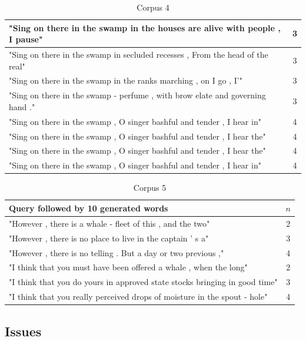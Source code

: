 \documentclass[a4paper,12pt]{article}
\begin{document}
\begin{table}
\begin{tabular}{| l |c|}
"Sing on there in the swamp in the houses are alive with people , I pause" & 3 \\ \hline
"Sing on there in the swamp in secluded recesses , From the head of the real" & 3 \\ \hline
"Sing on there in the swamp in the ranks marching , on I go , I'" & 3 \\ \hline
"Sing on there in the swamp - perfume , with brow elate and governing hand ." & 3 \\ \hline

"Sing on there in the swamp , O singer bashful and tender , I hear in" & 4 \\ \hline
"Sing on there in the swamp , O singer bashful and tender , I hear the" & 4 \\ \hline
"Sing on there in the swamp , O singer bashful and tender , I hear the" & 4 \\ \hline
"Sing on there in the swamp , O singer bashful and tender , I hear in" & 4 \\ \hline

\end{tabular}
\caption{ Corpus 4}
\label{tab:corpus4}
\end{table}

\begin{table}
\begin{tabular}{| l |c|}
\hline
Query followed by 10 generated words & $n$ \\ \hline
"However , there is a whale - fleet of this , and the two" & 2\\ \hline
"However , there is no place to live in the captain ' s a"& 3 \\ \hline
"However , there is no telling . But a day or two previous ," & 4 \\ \hline
"I think that you must have been offered a whale , when the long" & 2\\ \hline
"I think that you do yours in approved state stocks bringing in good time"& 3 \\ \hline
"I think that you really perceived drops of moisture in the spout - hole" & 4 \\ \hline
\end{tabular}
\caption{Corpus 5}
\label{tab:corpus5}
\end{table}

\subsection{Issues}
\end{document}
